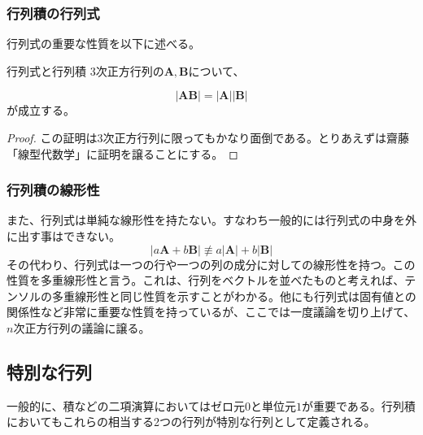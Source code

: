 \subsubsection{行列積の行列式}
行列式の重要な性質を以下に述べる。
\begin{theorem*}{行列式と行列積}
	3次正方行列の\(\boldsymbol{A},\boldsymbol{B}\)について、

	\begin{equation}
		|\boldsymbol{A}\boldsymbol{B}|=|\boldsymbol{A}||\boldsymbol{B}|
	\end{equation}
	が成立する。
\end{theorem*}
\begin{proof}
	この証明は3次正方行列に限ってもかなり面倒である。とりあえずは齋藤「線型代数学」に証明を譲ることにする。
\end{proof}
\subsubsection{行列積の線形性}
また、行列式は単純な線形性を持たない。すなわち一般的には行列式の中身を外に出す事はできない。
\begin{equation}
	|a\boldsymbol{A}+b\boldsymbol{B}|\not\equiv a |\boldsymbol{A}|+b|\boldsymbol{B}|
\end{equation}
その代わり、行列式は一つの行や一つの列の成分に対しての線形性を持つ。この性質を多重線形性と言う。これは、行列をベクトルを並べたものと考えれば、テンソルの多重線形性と同じ性質を示すことがわかる。他にも行列式は固有値との関係性など非常に重要な性質を持っているが、ここでは一度議論を切り上げて、\(n\)次正方行列の議論に譲る。

\subsection{特別な行列}
一般的に、積などの二項演算においてはゼロ元\(0\)と単位元\(1\)が重要である。行列積においてもこれらの相当する2つの行列が特別な行列として定義される。
